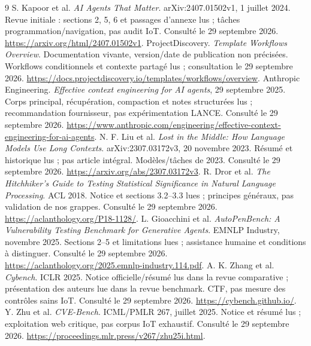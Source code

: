 \documentclass[11pt,a4paper]{article}
\begin{document}
\begin{thebibliography}{9}\small
{} S. Kapoor et al. \emph{AI Agents That Matter}. arXiv:2407.01502v1, 1 juillet 2024. Revue initiale : sections 2, 5, 6 et passages d'annexe lus ; tâches programmation/navigation, pas audit IoT. Consulté le 29 septembre 2026. \url{https://arxiv.org/html/2407.01502v1}.
 ProjectDiscovery. \emph{Template Workflows Overview}. Documentation vivante, version/date de publication non précisées. Workflows conditionnels et contexte partagé lus ; consultation le 29 septembre 2026. \url{https://docs.projectdiscovery.io/templates/workflows/overview}.
 Anthropic Engineering. \emph{Effective context engineering for AI agents}, 29 septembre 2025. Corps principal, récupération, compaction et notes structurées lus ; recommandation fournisseur, pas expérimentation LANCE. Consulté le 29 septembre 2026. \url{https://www.anthropic.com/engineering/effective-context-engineering-for-ai-agents}.
 N. F. Liu et al. \emph{Lost in the Middle: How Language Models Use Long Contexts}. arXiv:2307.03172v3, 20 novembre 2023. Résumé et historique lus ; pas article intégral. Modèles/tâches de 2023. Consulté le 29 septembre 2026. \url{https://arxiv.org/abs/2307.03172v3}.
 R. Dror et al. \emph{The Hitchhiker's Guide to Testing Statistical Significance in Natural Language Processing}. ACL 2018. Notice et sections 3.2--3.3 lues ; principes généraux, pas validation de nos grappes. Consulté le 29 septembre 2026. \url{https://aclanthology.org/P18-1128/}.
 L. Gioacchini et al. \emph{AutoPenBench: A Vulnerability Testing Benchmark for Generative Agents}. EMNLP Industry, novembre 2025. Sections 2--5 et limitations lues ; assistance humaine et conditions à distinguer. Consulté le 29 septembre 2026. \url{https://aclanthology.org/2025.emnlp-industry.114.pdf}.
 A. K. Zhang et al. \emph{Cybench}. ICLR 2025. Notice officielle/résumé lus dans la revue comparative ; présentation des auteurs lue dans la revue benchmark. CTF, pas mesure des contrôles sains IoT. Consulté le 29 septembre 2026. \url{https://cybench.github.io/}.
 Y. Zhu et al. \emph{CVE-Bench}. ICML/PMLR 267, juillet 2025. Notice et résumé lus ; exploitation web critique, pas corpus IoT exhaustif. Consulté le 29 septembre 2026. \url{https://proceedings.mlr.press/v267/zhu25i.html}.
\end{thebibliography}
\end{document}
